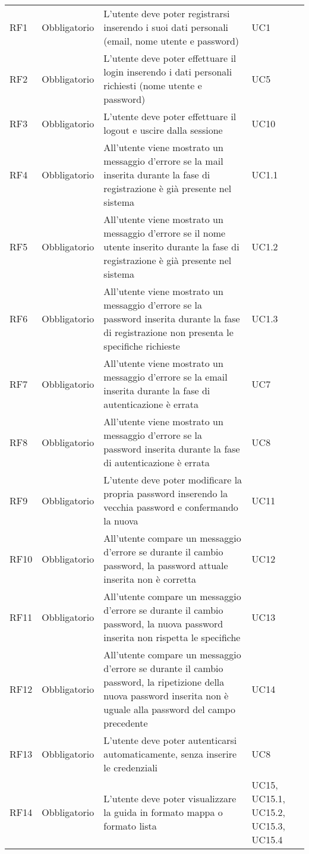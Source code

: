 {\begin{longtable}{C{.15\freewidth} C{.2\freewidth} C{.528\freewidth} C{.15\freewidth}}
      RF1 & Obbligatorio & L'utente deve poter registrarsi inserendo i suoi dati personali (email, nome utente e password) & UC1 \\
      RF2 & Obbligatorio & L'utente deve poter effettuare il login inserendo i dati personali richiesti (nome utente e password) & UC5 \\
      RF3 & Obbligatorio & L'utente deve poter effettuare il logout e uscire dalla sessione & UC10 \\
      RF4 & Obbligatorio & All'utente viene mostrato un messaggio d'errore se la mail inserita durante la fase di registrazione è già presente nel sistema  & UC1.1 \\
      RF5 & Obbligatorio & All'utente viene mostrato un messaggio d'errore se il nome utente inserito durante la fase di registrazione è già presente nel sistema & UC1.2 \\
      RF6 & Obbligatorio & All'utente viene mostrato un messaggio d'errore se la password inserita durante la fase di registrazione non presenta le specifiche richieste & UC1.3 \\
      RF7 & Obbligatorio & All'utente viene mostrato un messaggio d'errore se la email inserita durante la fase di autenticazione è errata & UC7\\
      RF8 & Obbligatorio & All'utente viene mostrato un messaggio d'errore se la password inserita durante la fase di autenticazione è errata & UC8 \\
      RF9 & Obbligatorio & L'utente deve poter modificare la propria password inserendo la vecchia password e confermando la nuova & UC11 \\
      RF10 & Obbligatorio & All'utente compare un messaggio d'errore se durante il cambio password, la password attuale inserita non è corretta & UC12 \\
      RF11 & Obbligatorio & All'utente compare un messaggio d'errore se durante il cambio password, la nuova password inserita non rispetta le specifiche & UC13 \\
      RF12 & Obbligatorio & All'utente compare un messaggio d'errore se durante il cambio password, la ripetizione della nuova password inserita non è uguale alla password del campo precedente & UC14 \\
      RF13 & Obbligatorio & L'utente deve poter autenticarsi automaticamente, senza inserire le credenziali & UC8\\
      RF14 & Obbligatorio & L'utente deve poter visualizzare la guida in formato mappa o formato lista & UC15, UC15.1, UC15.2, UC15.3, UC15.4 \\

\end{longtable}}
